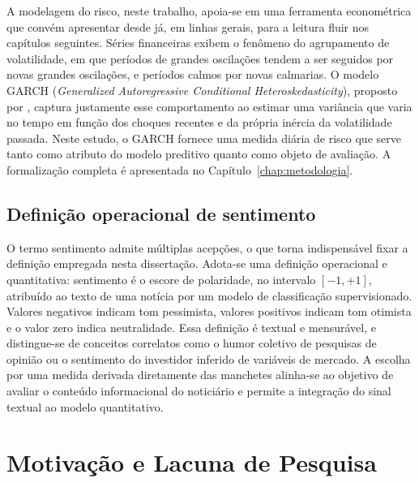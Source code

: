 A modelagem do risco, neste trabalho, apoia-se em uma ferramenta econométrica que convém apresentar desde já, em linhas gerais, para a leitura fluir nos capítulos seguintes. Séries financeiras exibem o fenômeno do agrupamento de volatilidade, em que períodos de grandes oscilações tendem a ser seguidos por novas grandes oscilações, e períodos calmos por novas calmarias. O modelo GARCH (\textit{Generalized Autoregressive Conditional Heteroskedasticity}), proposto por , captura justamente esse comportamento ao estimar uma variância que varia no tempo em função dos choques recentes e da própria inércia da volatilidade passada. Neste estudo, o GARCH fornece uma medida diária de risco que serve tanto como atributo do modelo preditivo quanto como objeto de avaliação. A formalização completa é apresentada no Capítulo~\ref{chap:metodologia}.

\subsection{Definição operacional de sentimento}

O termo sentimento admite múltiplas acepções, o que torna indispensável fixar a definição empregada nesta dissertação. Adota-se uma definição operacional e quantitativa: sentimento é o escore de polaridade, no intervalo $[-1, +1]$, atribuído ao texto de uma notícia por um modelo de classificação supervisionado. Valores negativos indicam tom pessimista, valores positivos indicam tom otimista e o valor zero indica neutralidade. Essa definição é textual e mensurável, e distingue-se de conceitos correlatos como o humor coletivo de pesquisas de opinião ou o sentimento do investidor inferido de variáveis de mercado. A escolha por uma medida derivada diretamente das manchetes alinha-se ao objetivo de avaliar o conteúdo informacional do noticiário e permite a integração do sinal textual ao modelo quantitativo.

\section{Motivação e Lacuna de Pesquisa}

